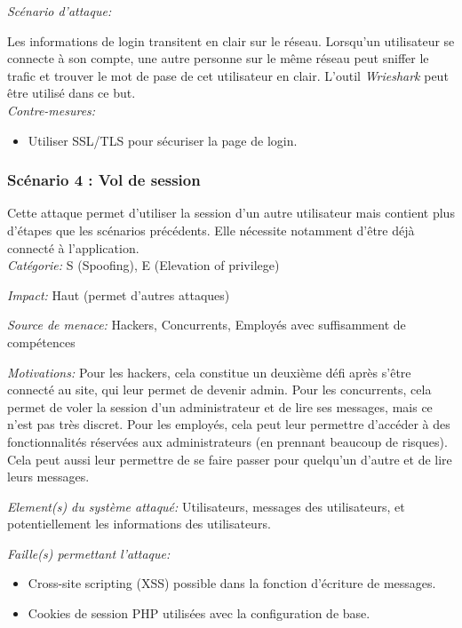 \documentclass{article}
\begin{document}
\textit{Scénario d'attaque:}

Les informations de login transitent en clair sur le réseau. Lorsqu'un
utilisateur se connecte à son compte, une autre personne sur le même
réseau peut sniffer le trafic et trouver le mot de pase de cet
utilisateur en clair. L'outil \emph{Wrieshark} peut être utilisé dans ce
but.\\

\textit{Contre-mesures:}

\begin{itemize}

\item
  Utiliser SSL/TLS pour sécuriser la page de login.
\end{itemize}

\subsubsection{Scénario 4 : Vol de session}

Cette attaque permet d'utiliser la session d'un autre utilisateur mais
contient plus d'étapes que les scénarios précédents. Elle nécessite
notamment d'être déjà connecté à l'application.\\

\textit{Catégorie:} S (Spoofing), E (Elevation of privilege)

\textit{Impact:} Haut (permet d'autres attaques)

\textit{Source de menace:} Hackers, Concurrents, Employés avec
suffisamment de compétences

\textit{Motivations:} Pour les hackers, cela constitue un deuxième défi après s'être
  connecté au site, qui leur permet de devenir admin. Pour les concurrents, cela permet de voler la session d'un
  administrateur et de lire ses messages, mais ce n'est pas très
  discret. Pour les employés, cela peut leur permettre d'accéder à des
  fonctionnalités réservées aux administrateurs (en prennant beaucoup de
  risques). Cela peut aussi leur permettre de se faire passer pour
  quelqu'un d'autre et de lire leurs messages.


\textit{Element(s) du système attaqué:} Utilisateurs, messages des
utilisateurs, et potentiellement les informations des utilisateurs.

\textit{Faille(s) permettant l'attaque:}

\begin{itemize}

\item
  Cross-site scripting (XSS) possible dans la fonction d'écriture de
  messages.
\item
  Cookies de session PHP utilisées avec la configuration de base.
\end{itemize}
\end{document}
